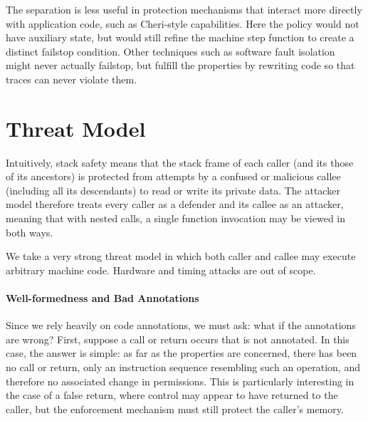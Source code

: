 \documentclass[acmsmall,review,anonymous]{acmart}\settopmatter{printfolios=true,printccs=false,printacmref=false}
\begin{document}
The separation is less useful in protection mechanisms that interact more directly
with application code, such as Cheri-style capabilities\citep{??}. Here
the policy would not have auxiliary state, but would still refine the machine step
function to create a distinct failstop condition. Other techniques such as
software fault isolation~\citep{??} might never actually failstop, but fulfill
the properties by rewriting code so that traces can never violate them.

\section{Threat Model}
\label{sec:threat}

Intuitively, stack safety means that the stack frame of each caller (and its
those of its ancestors) is protected
from attempts by a confused or malicious callee (including all its descendants)
to read or write its private data.
The attacker model therefore treats every caller as a defender and its callee as
an attacker, meaning that with nested calls, a single function invocation
may be viewed in both ways.

We take a very strong threat model in which both caller and callee may execute
arbitrary machine code. Hardware and timing attacks are out of scope.

\paragraph*{Well-formedness and Bad Annotations}


Since we rely heavily on code annotations, we must ask: what if the annotations
are wrong? First, suppose a call or return occurs that is not annotated.
In this case, the answer is simple: as far as the properties are concerned, there has
been no call or return, only an instruction sequence resembling such an operation, and
therefore no associated change in permissions. This is particularly interesting in the
case of a false return, where control may appear to have returned to the caller, but
the enforcement mechanism must still protect the caller's memory.
\end{document}

